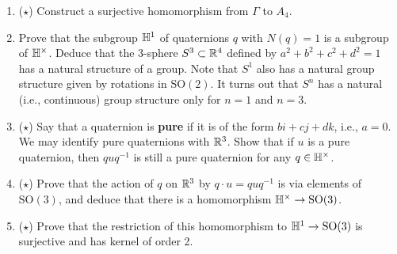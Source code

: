 \documentclass[../psets.tex]{subfiles}
\begin{document}
\begin{enumerate}
\begin{enumerate}
        \item ($\star$) Construct a surjective homomorphism from $\Gamma$ to $A_4$.
        \item Prove that the subgroup $\mathbb{H}^1$ of quaternions $q$ with $N(q)=1$ is a subgroup of $\mathbb{H}^\times$. Deduce that the 3-sphere $S^3\subset\mathbb{R}^4$ defined by $a^2+b^2+c^2+d^2=1$ has a natural structure of a group. Note that $S^1$ also has a natural group structure given by rotations in $\text{SO}(2)$. It turns out that $S^n$ has a natural (i.e., continuous) group structure only for $n=1$ and $n=3$.
        \item ($\star$) Say that a quaternion is \textbf{pure} if it is of the form $bi+cj+dk$, i.e., $a=0$. We may identify pure quaternions with $\mathbb{R}^3$. Show that if $u$ is a pure quaternion, then $quq^{-1}$ is still a pure quaternion for any $q\in\mathbb{H}^\times$.
        \item ($\star$) Prove that the action of $q$ on $\mathbb{R}^3$ by $q\cdot u=quq^{-1}$ is via elements of $\text{SO}(3)$, and deduce that there is a homomorphism $\mathbb{H}^\times\to\text{SO}(3)$.
        \item ($\star$) Prove that the restriction of this homomorphism to $\mathbb{H}^1\to\text{SO}(3)$ is surjective and has kernel of order 2.
    \end{enumerate}
\end{enumerate}
\end{document}
